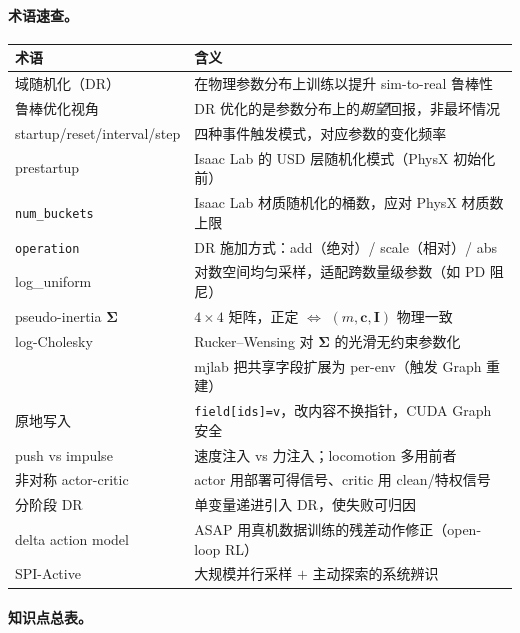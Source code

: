 \paragraph{术语速查。}

\begin{center}
\small
\begin{tabular}{@{}lp{8.6cm}@{}}
\toprule
术语 & 含义 \\
\midrule
域随机化（DR） & 在物理参数分布上训练以提升 sim-to-real 鲁棒性 \\
鲁棒优化视角 & DR 优化的是参数分布上的\emph{期望}回报，非最坏情况 \\
startup/reset/interval/step & 四种事件触发模式，对应参数的变化频率 \\
prestartup & Isaac Lab 的 USD 层随机化模式（PhysX 初始化前） \\
\verb|num_buckets| & Isaac Lab 材质随机化的桶数，应对 PhysX 材质数上限 \\
\verb|operation| & DR 施加方式：add（绝对）/ scale（相对）/ abs \\
log\_uniform & 对数空间均匀采样，适配跨数量级参数（如 PD 阻尼） \\
pseudo-inertia $\boldsymbol\Sigma$ & $4\times4$ 矩阵，正定 $\Leftrightarrow$ $(m,\mathbf c,\mathbf I)$ 物理一致 \\
log-Cholesky & Rucker--Wensing 对 $\boldsymbol\Sigma$ 的光滑无约束参数化 \\
\Verb[breaklines]|expand_model_fields| & mjlab 把共享字段扩展为 per-env（触发 Graph 重建） \\
原地写入 & \verb|field[ids]=v|，改内容不换指针，CUDA Graph 安全 \\
push vs impulse & 速度注入 vs 力注入；locomotion 多用前者 \\
非对称 actor-critic & actor 用部署可得信号、critic 用 clean/特权信号 \\
分阶段 DR & 单变量递进引入 DR，使失败可归因 \\
delta action model & ASAP 用真机数据训练的残差动作修正（open-loop RL） \\
SPI-Active & 大规模并行采样 $+$ 主动探索的系统辨识 \\
\bottomrule
\end{tabular}
\end{center}

\paragraph{知识点总表。}

